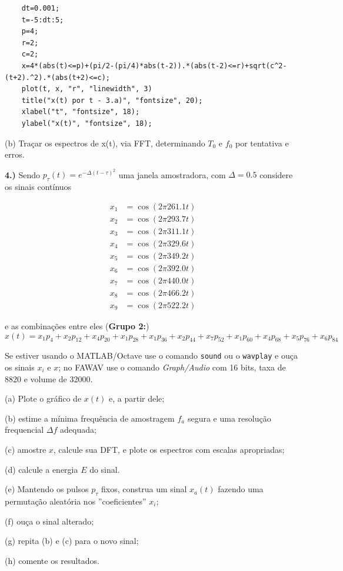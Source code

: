 \documentclass[10pt]{article}
\begin{document}
\begin{verbatim}
    dt=0.001;
    t=-5:dt:5;
    p=4;
    r=2;
    c=2;
    x=4*(abs(t)<=p)+(pi/2-(pi/4)*abs(t-2)).*(abs(t-2)<=r)+sqrt(c^2-(t+2).^2).*(abs(t+2)<=c);
    plot(t, x, "r", "linewidth", 3)
    title("x(t) por t - 3.a)", "fontsize", 20);
    xlabel("t", "fontsize", 18);
    ylabel("x(t)", "fontsize", 18);
\end{verbatim}

(b) Traçar os espectros de x(t), via FFT, determinando $T_0$ e $f_0$ por tentativa e erros.


\vspace{\baselineskip}


\textbf{4.)} Sendo $p_{\tau}(t) = e^{-\Delta (t - \tau)^2}$ uma janela amostradora, com $\Delta = 0.5$ considere os sinais contínuos

\begin{flushleft}
\begin{align*}
    x_1 &= \cos(2 \pi 261.1 t)\\
    x_2 &= \cos(2 \pi 293.7 t)\\
    x_3 &= \cos(2 \pi 311.1 t)\\
    x_4 &= \cos(2 \pi 329.6 t)\\
    x_5 &= \cos(2 \pi 349.2 t)\\
    x_6 &= \cos(2 \pi 392.0 t)\\
    x_7 &= \cos(2 \pi 440.0 t)\\
    x_8 &= \cos(2 \pi 466.2 t)\\
    x_9 &= \cos(2 \pi 522.2 t)
\end{align*}
\end{flushleft}
e as combinações entre eles (\textbf{Grupo 2:})
\[x(t) = x_1p_4 + x_2p_{12} + x_4p_{20} + x_1p_{28} + x_1p_{36} + x_2p_{44} + x_7p_{52} + x_1p_{60} + x_4p_{68} + x_5p_{76} + x_6p_{84}\]

Se estiver usando o MATLAB/Octave use o comando \texttt{sound} ou o \texttt{wavplay} e ouça os sinais $x_i$ e $x$; no FAWAV use o comando \emph{Graph/Audio} com 16 bits, taxa de 8820 e volume de 32000.

(a) Plote o gráfico de $x(t)$ e, a partir dele;

(b) estime a mínima frequência de amostragem $f_a$ segura e uma resolução frequencial $\Delta f$ adequada;

(c) amostre $x$, calcule sua DFT, e plote os espectros com escalas apropriadas;

(d) calcule a energia $E$ do sinal.

(e) Mantendo os pulsos $p_{\tau}$ fixos, construa um sinal $x_a(t)$ fazendo uma permutação aleatória nos ''coeficientes'' $x_i$;

(f) ouça o sinal alterado;

(g) repita (b) e (c) para o novo sinal;

(h) comente os resultados.
\end{document}

